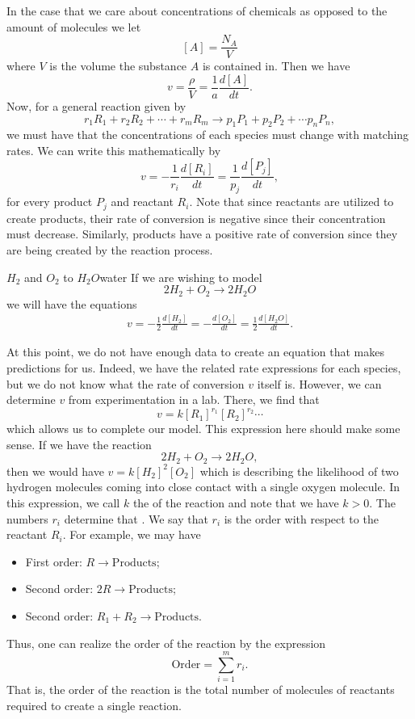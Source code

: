         In the case that we care about concentrations of chemicals as opposed to the amount of molecules we let
        \[
        [A]=\frac{N_A}{V}
        \]
        where $V$ is the volume the substance $A$ is contained in.  Then we have
        \[
        v=\frac{\rho}{V}=\frac{1}{a}\frac{d[A]}{dt}.
        \]
        Now, for a general reaction given by
        \[
        r_1R_1 + r_2R_2 + \cdots + r_mR_m \to p_1 P_1 + p_2P_2 +\cdots p_n P_n,
        \]
        we must have that the concentrations of each species must change with matching rates.  We can write this mathematically by
        \[
        v=-\frac{1}{r_i}\frac{d[R_i]}{dt}=\frac{1}{p_j}\frac{d[P_j]}{dt},
        \]
        for every product $P_j$ and reactant $R_i$. Note that since reactants are utilized to create products, their rate of conversion is negative since their concentration must decrease.  Similarly, products have a positive rate of conversion since they are being created by the reaction process.

        \begin{ex}{$H_2$ and $O_2$ to $H_2O$}{water}
        If we are wishing to model
        \[
        2H_2 + O_2 \to 2H_2O
        \]
        we will have the equations
        \begin{align*}
            v=-\frac{1}{2}\frac{d[H_2]}{dt}=-\frac{d[O_2]}{dt}=\frac{1}{2}\frac{d[H_2O]}{dt}.
        \end{align*}
        \end{ex}

        At this point, we do not have enough data to create an equation that makes predictions for us. Indeed, we have the related rate expressions for each species, but we do not know what the rate of conversion $v$ itself is. However, we can determine $v$ from experimentation in a lab.  There, we find that
        \[
        v=k[R_1]^{r_1}[R_2]^{r_2}\cdots
        \]
        which allows us to complete our model. This expression here should make some sense.  If we have the reaction
        \[
            2H_2 + O_2 \to 2H_2 O,
        \]
        then we would have $v=k[H_2]^2 [O_2]$ which is describing the likelihood of two hydrogen molecules coming into close contact with a single oxygen molecule.  In this expression, we call $k$ the  of the reaction and note that we have $k>0$. The numbers $r_i$ determine that . We say that $r_i$ is the order with respect to the reactant $R_i$. For example, we may have
        \begin{itemize}
            \item First order: $R \to \textrm{Products}$;
            \item Second order: $2R \to \textrm{Products}$;
            \item Second order: $R_1+R_2 \to \textrm{Products}$.
        \end{itemize}
        Thus, one can realize the order of the reaction by the expression
        \[
            \textrm{Order} = \sum_{i=1}^m r_i.
        \]
        That is, the order of the reaction is the total number of molecules of reactants required to create a single reaction.

